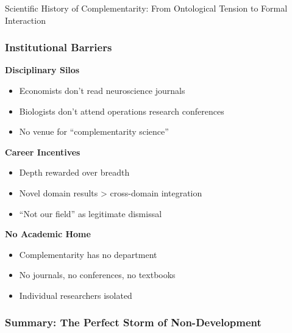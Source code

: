 \begin{chapter}{Scientific History of Complementarity: From Ontological Tension to Formal Interaction}
\subsubsection{Institutional Barriers}

\textbf{Disciplinary Silos}
\begin{itemize}[noitemsep]
    \item Economists don't read neuroscience journals
    \item Biologists don't attend operations research conferences
    \item No venue for ``complementarity science''
\end{itemize}

\textbf{Career Incentives}
\begin{itemize}[noitemsep]
    \item Depth rewarded over breadth
    \item Novel domain results > cross-domain integration
    \item ``Not our field'' as legitimate dismissal
\end{itemize}

\textbf{No Academic Home}
\begin{itemize}[noitemsep]
    \item Complementarity has no department
    \item No journals, no conferences, no textbooks
    \item Individual researchers isolated
\end{itemize}

\subsubsection{Summary: The Perfect Storm of Non-Development}

\begin{figure}[h]
\centering
{}
\end{figure}
\end{chapter}
